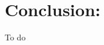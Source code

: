 \documentclass{article}[11pt]
\begin{document}
 \section*{Conclusion:} 
 
 To do








\end{document}
